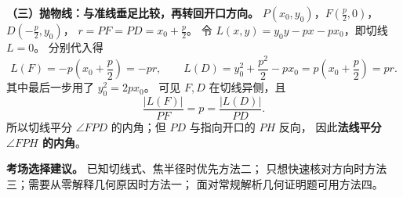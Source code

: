 \begin{proofbox}
\textbf{（三）抛物线：与准线垂足比较，再转回开口方向。}
$P(x_0,y_0)$，$F(\tfrac p2,0)$，$D(-\tfrac p2,y_0)$，
$r=PF=PD=x_0+\tfrac p2$。
令 $L(x,y)=y_0y-px-px_0$，即切线 $L=0$。
分别代入得
\[
L(F)=-p\left(x_0+\frac p2\right)=-pr,
\qquad
L(D)=y_0^2+\frac{p^2}{2}-px_0
=p\left(x_0+\frac p2\right)=pr.
\]
其中最后一步用了 $y_0^2=2px_0$。
可见 $F,D$ 在切线异侧，且
\[
\frac{|L(F)|}{PF}=p=\frac{|L(D)|}{PD}.
\]
所以切线平分 $\angle FPD$ 的内角；但 $PD$ 与指向开口的 $PH$ 反向，
因此\textbf{法线平分 $\angle FPH$ 的内角}。

\medskip\noindent
\textbf{考场选择建议。} 已知切线式、焦半径时优先方法二；
只想快速核对方向时方法三；需要从零解释几何原因时方法一；
面对常规解析几何证明题可用方法四。
\end{proofbox}
